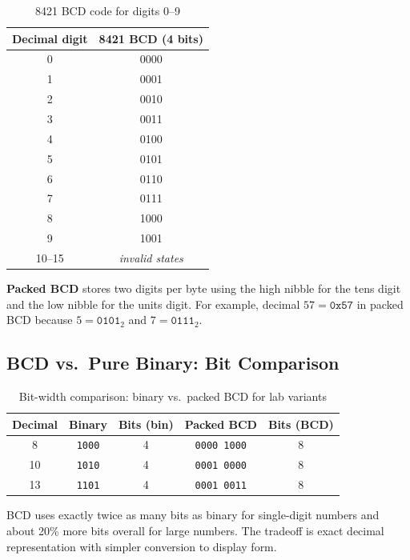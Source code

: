 \documentclass[12pt,a4paper]{article}
\begin{document}
\begin{table}[H]
  \centering
  \caption{8421 BCD code for digits 0--9}
  \renewcommand{\arraystretch}{1.2}
  \begin{tabular}{|c|c|}
    \hline
    \textbf{Decimal digit} & \textbf{8421 BCD (4 bits)} \\
    \hline
    0 & 0000 \\
    1 & 0001 \\
    2 & 0010 \\
    3 & 0011 \\
    4 & 0100 \\
    5 & 0101 \\
    6 & 0110 \\
    7 & 0111 \\
    8 & 1000 \\
    9 & 1001 \\
    \hline
    10--15 & \textit{invalid states} \\
    \hline
  \end{tabular}
\end{table}

\noindent\textbf{Packed BCD} stores two digits per byte using the high nibble
for the tens digit and the low nibble for the units digit. For example,
decimal $57 = \texttt{0x57}$ in packed BCD because
$5 = \texttt{0101}_2$ and $7 = \texttt{0111}_2$.

\subsection{BCD vs.\ Pure Binary: Bit Comparison}

\begin{table}[H]
  \centering
  \caption{Bit-width comparison: binary vs.\ packed BCD for lab variants}
  \renewcommand{\arraystretch}{1.3}
  \begin{tabular}{|c|c|c|c|c|}
    \hline
    \textbf{Decimal} & \textbf{Binary} & \textbf{Bits (bin)} & \textbf{Packed BCD} & \textbf{Bits (BCD)} \\
    \hline
    8  & \texttt{1000}          & 4 & \texttt{0000\ 1000} & 8 \\
    10 & \texttt{1010}          & 4 & \texttt{0001\ 0000} & 8 \\
    13 & \texttt{1101}          & 4 & \texttt{0001\ 0011} & 8 \\
    \hline
  \end{tabular}
\end{table}

\noindent BCD uses exactly twice as many bits as binary for single-digit
numbers and about 20\% more bits overall for large numbers.  The tradeoff is
exact decimal representation with simpler conversion to display form.
\end{document}
